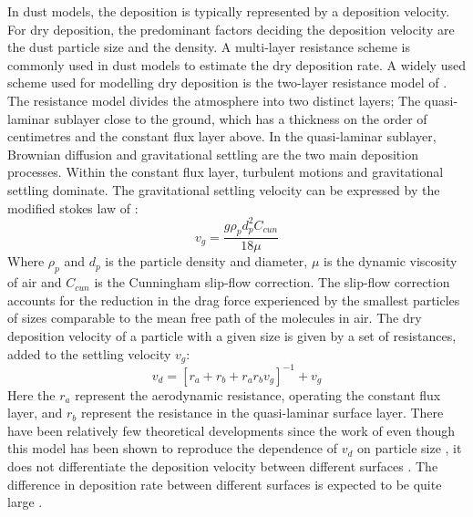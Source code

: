 In dust models, the deposition is typically represented by a deposition velocity. For dry deposition, the predominant factors deciding the deposition velocity are the dust particle size and the density. A multi-layer resistance scheme is commonly used in dust models to estimate the dry deposition rate. A widely used scheme used for modelling dry deposition is the two-layer resistance model of \parencite{slinn1982predictions}. The resistance model divides the atmosphere into two distinct layers; The quasi-laminar sublayer close to the ground, which has a thickness on the order of centimetres and the constant flux layer above. In the quasi-laminar sublayer, Brownian diffusion and gravitational settling are the two main deposition processes. Within the constant flux layer, turbulent motions and gravitational settling dominate. The gravitational settling velocity can be expressed by the modified stokes law of \parencite{slinn1982predictions}: 
\begin{equation}
    v_g = \frac{g\rho_p d_p^2 C_{cun}}{18\mu}
\end{equation}
Where $\rho_p$ and $d_p$ is the particle density and diameter, $\mu$ is the dynamic viscosity of air and $C_{cun}$ is the Cunningham slip-flow correction. The slip-flow correction accounts for the reduction in the drag force experienced by the smallest particles of sizes comparable to the mean free path of the molecules in air. The dry deposition velocity of a particle with a given size is given by a set of resistances, added to the settling velocity $v_g$:
\begin{equation}\label{eq:drydep_resistance}
    v_d=[r_a + r_b + r_a r_b v_g]^{-1} + v_g
\end{equation}
Here the $r_a$ represent the aerodynamic resistance, operating the constant flux layer, and $r_b$ represent the resistance in the quasi-laminar surface layer. There have been relatively few theoretical developments since the work of \textcite{slinn1982predictions} even though this model has been shown to reproduce the dependence of $v_d$ on particle size , it does not differentiate the deposition velocity between different surfaces \parencite{shao2011dust}. The difference in deposition rate between different surfaces is expected to be quite large . 

